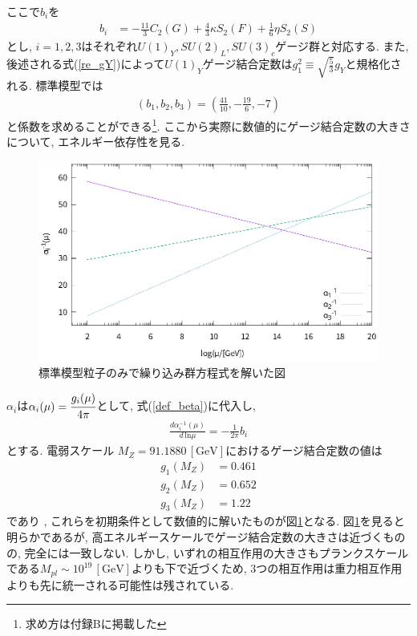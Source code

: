 ここで$b_i$を
\begin{align}
  b_i &= -\frac{11}{3}C_2(G) +\frac{4}{3}\kappa S_2(F) + \frac{1}{6}\eta S_2(S)\nonumber
\end{align}
とし, $i=1,2,3$はそれぞれ$U(1)_Y, SU(2)_L, SU(3)_c$ゲージ群と対応する.
また, 後述される式(\ref{re_gY})によって$U(1)_Y$ゲージ結合定数は$g_1^2\equiv \sqrt{\frac{5}{3}}g_Y$と規格化される.
標準模型では
\begin{align}
  \left(b_1, b_2, b_3 \right) = \left( \frac{41}{10}, -\frac{19}{6}, -7\right)\nonumber
\end{align}
と係数を求めることができる\footnote{求め方は付録Bに掲載した}.
ここから実際に数値的にゲージ結合定数の大きさについて, エネルギー依存性を見る.
\begin{figure}[ht]
  \centering
  \includegraphics[width=12truecm,clip]{fig/RGE_SM.eps}
  \caption{標準模型粒子のみで繰り込み群方程式を解いた図}
  \label{fig:RGE_SM}
\end{figure}
$\alpha_i$は$\alpha_i(\mu) = \cfrac{g_i(\mu)}{4\pi}$として, 式(\ref{def_beta})に代入し, 
\begin{align}
  \frac{d \alpha_i^{-1}(\mu)}{d\,\mathrm{ln}{\mu}} = -\frac{1}{2\pi}b_i \label{bfnc_1loop}
\end{align}
とする.
電弱スケール $M_Z=91.1880\,[\mathrm{GeV}]$におけるゲージ結合定数の値は
\begin{align}
  g_1(M_Z) &= 0.461\nonumber\\
  g_2(M_Z) &= 0.652\nonumber\\
  g_3(M_Z) &= 1.22\nonumber
\end{align}
であり
\cite{navasReviewParticlePhysics2024}, これらを初期条件として数値的に解いたものが図\ref{fig:RGE_SM}となる.
図\ref{fig:RGE_SM}を見ると明らかであるが, 高エネルギースケールでゲージ結合定数の大きさは近づくものの, 完全には一致しない.
しかし, いずれの相互作用の大きさもプランクスケールである$M_{pl}\sim 10^{19}\,[\mathrm{GeV}]$よりも下で近づくため, 3つの相互作用は重力相互作用よりも先に統一される可能性は残されている.

